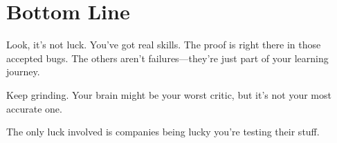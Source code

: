 \documentclass[11pt]{article}
\begin{document}
\section*{Bottom Line}

Look, it's not luck. You've got real skills. The proof is right there in those accepted bugs. The others aren't failures—they're just part of your learning journey.

Keep grinding. Your brain might be your worst critic, but it's not your most accurate one.

\begin{center}
\color{lightaccent}
The only luck involved is companies being lucky you're testing their stuff.
\end{center}
\end{document}
